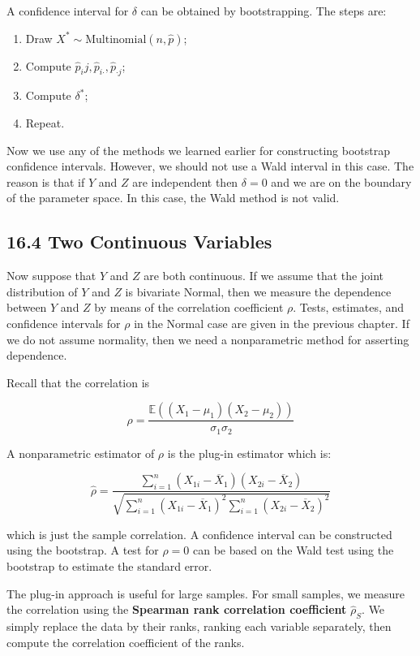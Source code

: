 {A confidence interval for \(\delta\) can be obtained by bootstrapping.
The steps are:

\begin{enumerate}[tightlist,label={\arabic*.}]
\item
  Draw \(X^* \sim \text{Multinomial}(n, \hat{p})\);
\item
  Compute \(\hat{p}_ij, \hat{p}_{i\text{·}}, \hat{p}_{\text{·}j}\);
\item
  Compute \(\delta^*\);
\item
  Repeat.
\end{enumerate}

Now we use any of the methods we learned earlier for constructing
bootstrap confidence intervals. However, we should not use a Wald
interval in this case. The reason is that if \(Y\) and \(Z\) are
independent then \(\delta = 0\) and we are on the boundary of the
parameter space. In this case, the Wald method is not valid.

\subsection{16.4 Two Continuous
Variables}\label{two-continuous-variables}

Now suppose that \(Y\) and \(Z\) are both continuous. If we assume that
the joint distribution of \(Y\) and \(Z\) is bivariate Normal, then we
measure the dependence between \(Y\) and \(Z\) by means of the
correlation coefficient \(\rho\). Tests, estimates, and confidence
intervals for \(\rho\) in the Normal case are given in the previous
chapter. If we do not assume normality, then we need a nonparametric
method for asserting dependence.

Recall that the correlation is

\[\rho = \frac{\mathbb{E}((X_1 - \mu_1)(X_2 - \mu_2))}{\sigma_1 \sigma_2} \]

A nonparametric estimator of \(\rho\) is the plug-in estimator which is:

\[\hat{\rho} = \frac{\sum_{i=1}^n (X_{1i} - \overline{X}_1)(X_{2i} - \overline{X}_2)}{\sqrt{\sum_{i=1}^n (X_{1i} - \overline{X}_1)^2 \sum_{i=1}^n (X_{2i} - \overline{X}_2)^2}} \]

which is just the sample correlation. A confidence interval can be
constructed using the bootstrap. A test for \(\rho = 0\) can be based on
the Wald test using the bootstrap to estimate the standard error.

The plug-in approach is useful for large samples. For small samples, we
measure the correlation using the \textbf{Spearman rank correlation
coefficient} \(\hat{\rho}_S\). We simply replace the data by their
ranks, ranking each variable separately, then compute the correlation
coefficient of the ranks.

}
